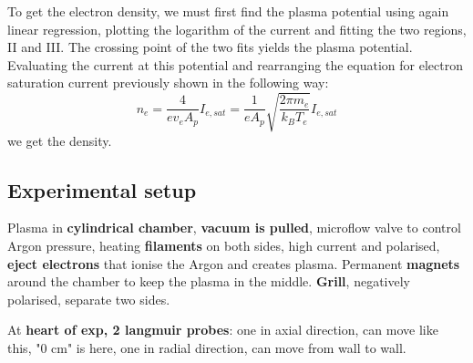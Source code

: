 To get the electron density, we must first find the plasma potential using again linear regression, plotting the logarithm of the current and fitting the two regions, II and III.
The crossing point of the two fits yields the plasma potential.
Evaluating the current at this potential and rearranging the equation for electron saturation current previously shown in the following way:
\begin{equation}
    n_e = \frac{4}{e v_e A_p} I_{e,sat} = \frac{1}{e A_p} \sqrt{\frac{2 \pi m_e}{k_B T_e}} I_{e,sat}
\end{equation}
we get the density.


\subsection{Experimental setup}
Plasma in \textbf{cylindrical chamber}, \textbf{vacuum is pulled}, microflow valve to control Argon pressure, heating \textbf{filaments} on both sides, high current and polarised, \textbf{eject electrons} that ionise the Argon and creates plasma. Permanent \textbf{magnets} around the chamber to keep the plasma in the middle. \textbf{Grill}, negatively polarised, separate two sides.

At \textbf{heart of exp, 2 langmuir probes}: one in axial direction, can move like this, "0 cm" is here, one in radial direction, can move from wall to wall.




